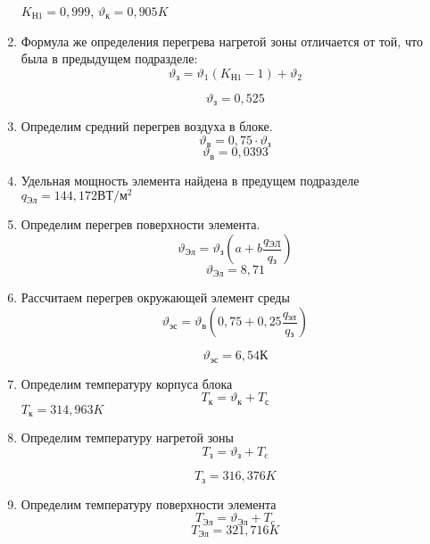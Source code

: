 \begin{enumerate}[label={\arabic*.}]
  $K\mathrm{_{Н1}} = 0,999$, $\vartheta\mathrm{_к} = 0,905 K$


\item Формула же определения перегрева нагретой зоны отличается от той,
  что была в предыдущем подразделе:
  \begin{equation}
    \vartheta\mathrm{_з} = \vartheta_1(K\mathrm{_{Н1}} - 1) + \vartheta_2
    \end{equation}

    $$\vartheta\mathrm{_з}=0,525$$
  \item Определим средний перегрев воздуха в блоке.
    \begin{equation}
      \vartheta\mathrm{_в} = 0,75 \cdot \vartheta\mathrm{_з}
    \end{equation}
    $$\vartheta\mathrm{_в} = 0,0393$$
  \item Удельная мощность элемента найдена в предущем подразделе
    $q\mathrm{_{Эл}} =144,172\mathrm{ВТ/м^2} $

  \item Определим перегрев поверхности элемента.
    \begin{equation}
      \vartheta\mathrm{_{Эл}} = \vartheta\mathrm{_{з}}(a + b \frac{q\mathrm{_{ЭЛ}}}{q\mathrm{_{з}}})
    \end{equation}
    $$\vartheta\mathrm{_{Эл}} = 8,71$$
  \item Рассчитаем перегрев окружающей элемент среды
    \begin{equation}
      \vartheta\mathrm{_{эс}} = \vartheta\mathrm{_в}(0,75 + 0,25\frac{q\mathrm{_{эл}}}{q\mathrm{_{з}}})
    \end{equation}
    
    $$\vartheta\mathrm{_{эс}} = 6,54К$$
  \item Определим температуру корпуса блока
    \begin{equation}
      T\mathrm{_к} = \vartheta\mathrm{_к} + T\mathrm{_с}
    \end{equation}
    $T\mathrm{_к} = 314,963K$
      \item Определим температуру нагретой зоны
    \begin{equation}
      T\mathrm{_з} = \vartheta\mathrm{_з} + T\mathrm{_c}
    \end{equation}

    $$T\mathrm{_з} = 316,376 K$$

  \item Определим температуру поверхности элемента
    \begin{equation}
      T\mathrm{_{Эл}} = \vartheta\mathrm{_{Эл}} + T\mathrm{_c}
    \end{equation}
    $$T\mathrm{_{Эл}} = 321,716 K$$


\end{enumerate}
